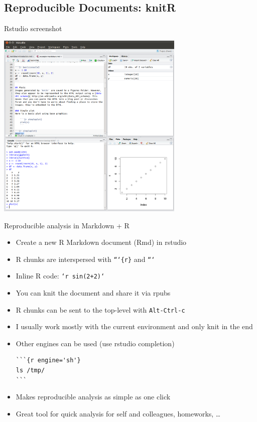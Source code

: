 \documentclass[xcolor=x11names,compress,8pt]{beamer}
\renewcommand{\(}{\begin{columns}}
\renewcommand{\)}{\end{columns}}
\newcommand{\<}[1]{\begin{column}{#1}}
\renewcommand{\>}{\end{column}}
\begin{document}
\subsection{Reproducible Documents: knitR}
\label{sec-4-2}
\begin{frame}[label=sec-4-2-1]{Rstudio screenshot}
\vspace{-.5cm}
\begin{center}
  \includegraphics[height=9cm]{./images/rstudio_shot.png}
\end{center}
\end{frame}
\begin{frame}[fragile,label=sec-4-2-2]{Reproducible analysis in Markdown + R}
 \begin{itemize}
\item Create a new \alert{R Markdown} document (Rmd) in rstudio
\item R chunks are interspersed with \texttt{```\{r\}} and \texttt{```}
\item Inline R code: \texttt{`r sin(2+2)`}
\item You can \alert{knit} the document and share it via \alert{rpubs}
\item R chunks can be sent to the top-level with \texttt{Alt-Ctrl-c}
\item I usually work mostly with the current environment and only knit in
the end
\item Other engines can be used (use rstudio \alert{completion})
\begin{verbatim}
```{r engine='sh'}
ls /tmp/
```
\end{verbatim}
\item Makes \alert{reproducible analysis as simple as one click}
\item Great tool for quick analysis for self and colleagues, homeworks, \ldots{}
\end{itemize}
\end{frame}
\end{document}
